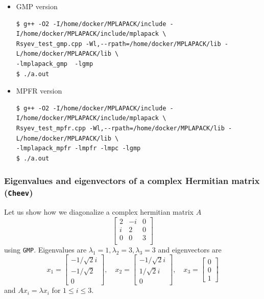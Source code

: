 \documentclass[12pt]{article}
\begin{document}
\begin{itemize}
\item GMP version
\begin{verbatim}
$ g++ -O2 -I/home/docker/MPLAPACK/include -I/home/docker/MPLAPACK/include/mplapack \
Rsyev_test_gmp.cpp -Wl,--rpath=/home/docker/MPLAPACK/lib -L/home/docker/MPLAPACK/lib \
-lmplapack_gmp  -lgmp
$ ./a.out
\end{verbatim}
\item MPFR version
\begin{verbatim}
$ g++ -O2 -I/home/docker/MPLAPACK/include -I/home/docker/MPLAPACK/include/mplapack \
Rsyev_test_mpfr.cpp -Wl,--rpath=/home/docker/MPLAPACK/lib -L/home/docker/MPLAPACK/lib \
-lmplapack_mpfr -lmpfr -lmpc -lgmp
$ ./a.out
\end{verbatim}
\end{itemize}

\subsubsection{Eigenvalues and eigenvectors of a complex Hermitian matrix ({\tt Cheev})}
Let us show how we diagonalize a complex hermitian matrix $A$
\[
\left[\begin{array}{lll}2 & -i & 0 \\ i & 2 & 0 \\ 0 & 0 & 3 \\ \end{array}\right]
\]
using {\tt GMP}. Eigenvalues are $\lambda_1 = 1, \lambda_2 = 3, \lambda_3 = 3$ and eigenvectors are
\[
x_{1}=\left[\begin{array}{c} -1/\sqrt{2} i \\ -1/\sqrt{2} \\ 0 \end{array}\right], \quad x_{2}=\left[\begin{array}{c}-1/\sqrt{2} i \\ 1/\sqrt{2} i \\ 0 \end{array}\right], \quad x_{3}=\left[\begin{array}{c} 0 \\ 0 \\ 1 \end{array}\right]
\]
and $A x_{i} = \lambda x_{i}$ for $1\leq i \leq 3$.
\end{document}
